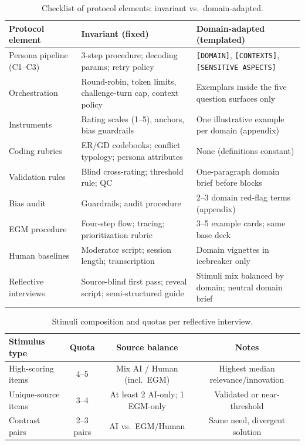 \documentclass[acmsmall]{acmart}
\begin{document}
\begin{table}[h!]
  \centering
  \caption{Checklist of protocol elements: invariant vs.\ domain-adapted.}
  \label{tab:invariants-vs-adapted}
  \small
  \begin{tabular}{@{}p{2.8cm} p{5.5cm} p{5.8cm}@{}}
    \toprule
    \textbf{Protocol element} & \textbf{Invariant (fixed)} & \textbf{Domain-adapted (templated)} \\
    \midrule
    Persona pipeline (C1--C3) & 3-step procedure; decoding params; retry policy & \texttt{[DOMAIN]}, \texttt{[CONTEXTS]}, \texttt{[SENSITIVE ASPECTS]} \\
    Orchestration & Round-robin, token limits, challenge-turn cap, context policy & Exemplars inside the five question surfaces only \\
    Instruments & Rating scales (1--5), anchors, bias guardrails & One illustrative example per domain (appendix) \\
    Coding rubrics & ER/GD codebooks; conflict typology; persona attributes & None (definitions constant) \\
    Validation rules & Blind cross-rating; threshold rule; QC & One-paragraph domain brief before blocks \\
    Bias audit & Guardrails; audit procedure & 2--3 domain red-flag terms (appendix) \\
    EGM procedure & Four-step flow; tracing; prioritization rubric & 3--5 example cards; same base deck \\
    Human baselines & Moderator script; session length; transcription & Domain vignettes in icebreaker only \\
    Reflective interviews & Source-blind first pass; reveal script; semi-structured guide & Stimuli mix balanced by domain; neutral domain brief \\
    \bottomrule
  \end{tabular}
\end{table}

\begin{table}[h!]
  \centering
  \caption{Stimuli composition and quotas per reflective interview.}
  \label{tab:stimuli-mix}
  \small
  \begin{tabular}{@{}lccc@{}}
    \toprule
    \textbf{Stimulus type} & \textbf{Quota} & \textbf{Source balance} & \textbf{Notes} \\
    \midrule
    High-scoring items     & 4--5  & Mix AI / Human (incl.\ EGM) & Highest median relevance/innovation \\
    Unique-source items    & 3--4  & At least 2 AI-only; 1 EGM-only & Validated or near-threshold \\
    Contrast pairs         & 2--3 pairs & AI vs.\ EGM/Human & Same need, divergent solution \\
    \bottomrule
  \end{tabular}
\end{table}
\end{document}
